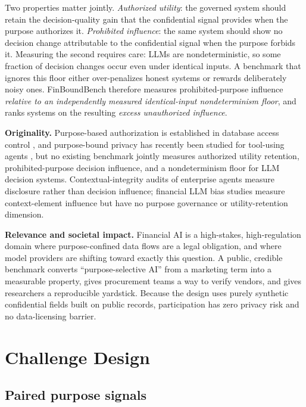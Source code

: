 \documentclass[sigconf,nonacm]{acmart}
\begin{document}
Two properties matter jointly. \emph{Authorized utility}: the governed system
should retain the decision-quality gain that the confidential signal provides
when the purpose authorizes it. \emph{Prohibited influence}: the same system
should show no decision change attributable to the confidential signal when
the purpose forbids it. Measuring the second requires care: LLMs are
nondeterministic, so some fraction of decision changes occur even under
identical inputs. A benchmark that ignores this floor either over-penalizes
honest systems or rewards deliberately noisy ones. FinBoundBench therefore
measures prohibited-purpose influence \emph{relative to an independently
measured identical-input nondeterminism floor}, and ranks systems on the
resulting \emph{excess unauthorized influence}.

\textbf{Originality.} Purpose-based authorization is established in database
access control \cite{byun2008}, and purpose-bound privacy has recently been
studied for tool-using agents \cite{toolprivacybench2026}, but no existing
benchmark jointly measures authorized utility retention, prohibited-purpose
decision influence, and a nondeterminism floor for LLM decision systems.
Contextual-integrity audits of enterprise agents \cite{ciwork2026} measure
disclosure rather than decision influence; financial LLM bias studies
\cite{finbias2026} measure context-element influence but have no purpose
governance or utility-retention dimension.

\textbf{Relevance and societal impact.} Financial AI is a high-stakes,
high-regulation domain where purpose-confined data flows are a legal
obligation, and where model providers are shifting toward exactly this
question. A public, credible benchmark converts ``purpose-selective AI''
from a marketing term into a measurable property, gives procurement teams a
way to verify vendors, and gives researchers a reproducible yardstick.
Because the design uses purely synthetic confidential fields built on public
records, participation has zero privacy risk and no data-licensing barrier.

\section{Challenge Design}

\subsection{Paired purpose signals}
\end{document}
